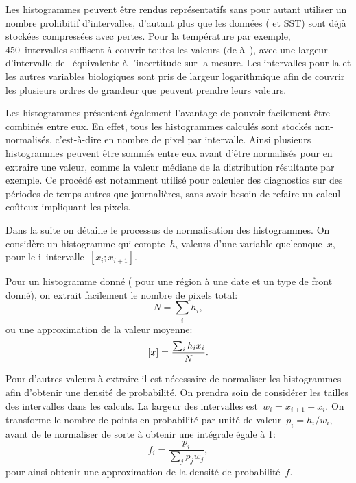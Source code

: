 Les histogrammes peuvent être rendus représentatifs sans pour autant utiliser un nombre prohibitif d'intervalles, d'autant plus que les données ( et SST) sont déjà stockées compressées avec pertes. Pour la température par exemple, 450~intervalles suffisent à couvrir toutes les valeurs (de  à~), avec une largeur d'intervalle de~ équivalente à l'incertitude sur la mesure.
Les intervalles pour la  et les autres variables biologiques sont pris de largeur logarithmique afin de couvrir les plusieurs ordres de grandeur que peuvent prendre leurs valeurs.

Les histogrammes présentent également l'avantage de pouvoir facilement être combinés entre eux.
En effet, tous les histogrammes calculés sont stockés non-normalisés, c'est-à-dire en nombre de pixel par intervalle. Ainsi plusieurs histogrammes peuvent être sommés entre eux avant d'être normalisés pour en extraire une valeur, comme la valeur médiane de la distribution résultante par exemple.
Ce procédé est notamment utilisé pour calculer des diagnostics sur des périodes de temps autres que journalières, sans avoir besoin de refaire un calcul coûteux impliquant les pixels.


Dans la suite on détaille le processus de normalisation des histogrammes.
On considère un histogramme qui compte~\(h_i\) valeurs d'une variable quelconque~\(x\), pour le i\ieme{}~intervalle~\(\left[x_i; x_{i+1} \right]\).

Pour un histogramme donné ( pour une région à une date et un type de front donné), on extrait facilement le nombre de pixels total:
\begin{equation}
  N = \sum_i h_i,
\end{equation}
ou une approximation de la valeur moyenne:
\begin{equation}
  \left[x\right] = \frac{\sum_i h_i x_i} {N}.
\end{equation}

Pour d'autres valeurs à extraire il est nécessaire de normaliser les histogrammes afin d'obtenir une densité de probabilité. On prendra soin de considérer les tailles des intervalles dans les calculs.
La largeur des intervalles est~\(w_i = x_{i+1}-x_i\). On transforme le nombre de points en probabilité par unité de valeur~\(p_i = h_i / w_i \), avant de le normaliser de sorte à obtenir une intégrale égale à 1:
\begin{equation}
  f_i = \frac{p_i} {\sum_j p_j w_j},
\end{equation}
pour ainsi obtenir une approximation de la densité de probabilité~\(f\).

